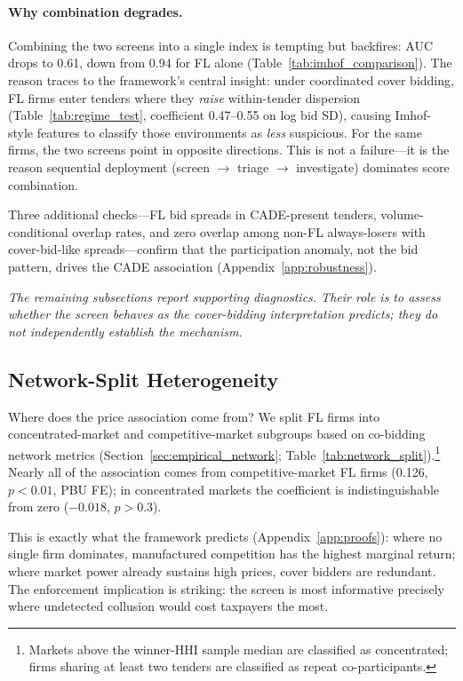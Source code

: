\paragraph{Why combination degrades.}
Combining the two screens into a single index is tempting but
backfires: AUC drops to 0.61, down from 0.94 for FL alone
(Table~\ref{tab:imhof_comparison}). The reason traces to the
framework's central insight: under coordinated cover bidding, FL
firms enter tenders where they \emph{raise} within-tender dispersion
(Table~\ref{tab:regime_test}, coefficient 0.47--0.55 on log bid SD),
causing Imhof-style features to classify those environments as
\emph{less} suspicious. For the same firms, the two screens point in opposite
directions. This is not a failure---it is the reason sequential
deployment (screen $\to$ triage $\to$ investigate) dominates score
combination.

Three additional checks---FL bid spreads in CADE-present tenders,
volume-conditional overlap rates, and zero overlap among non-FL
always-losers with cover-bid-like spreads---confirm that the
participation anomaly, not the bid pattern, drives the CADE
association (Appendix~\ref{app:robustness}).


\medskip
\noindent\textit{The remaining subsections report supporting
diagnostics. Their role is to assess whether the screen behaves as
the cover-bidding interpretation predicts; they do not independently
establish the mechanism.}
\medskip

\subsection{Network-Split Heterogeneity}
\label{sec:results_network}

Where does the price association come from?
We split FL firms into concentrated-market and competitive-market
subgroups based on co-bidding network metrics
(Section~\ref{sec:empirical_network};
Table~\ref{tab:network_split}).\footnote{Markets
above the winner-HHI sample median are classified as concentrated;
firms sharing at least two tenders are classified as repeat
co-participants.}
Nearly all of the association comes from competitive-market FL
firms (0.126, $p < 0.01$, PBU FE); in concentrated markets the
coefficient is indistinguishable from zero ($-0.018$, $p > 0.3$).

This is exactly what the framework predicts
(Appendix~\ref{app:proofs}): where no single firm dominates,
manufactured competition has the highest marginal return; where
market power already sustains high prices, cover bidders are
redundant. The enforcement implication is striking: the screen is
most informative precisely where undetected collusion would cost
taxpayers the most.

